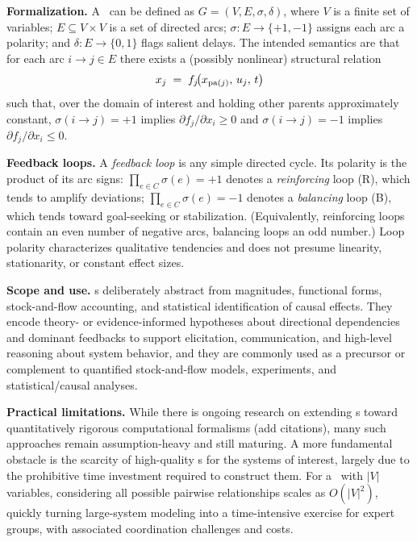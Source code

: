 \medskip
\noindent
\textbf{Formalization.} A \CLD\ can be defined as \(G=(V,E,\sigma,\delta)\), where \(V\) is a finite set of variables; \(E\subseteq V\times V\) is a set of directed arcs; \(\sigma:E\to\{+1,-1\}\) assigns each arc a polarity; and \(\delta:E\to\{0,1\}\) flags salient delays. The intended semantics are that for each arc \(i\!\to\!j\in E\) there exists a (possibly nonlinear) structural relation
\[
x_j \;=\; f_j\!\bigl(x_{\text{pa}(j)},\,u_j,\,t\bigr)
\]
such that, over the domain of interest and holding other parents approximately constant, \(\sigma(i\!\to\!j)=+1\) implies \(\partial f_j/\partial x_i \ge 0\) and \(\sigma(i\!\to\!j)=-1\) implies \(\partial f_j/\partial x_i \le 0\).

\medskip
\noindent
\textbf{Feedback loops.} A \emph{feedback loop} is any simple directed cycle. Its polarity is the product of its arc signs: \(\prod_{e\in C}\sigma(e)=+1\) denotes a \emph{reinforcing} loop (R), which tends to amplify deviations; \(\prod_{e\in C}\sigma(e)=-1\) denotes a \emph{balancing} loop (B), which tends toward goal-seeking or stabilization. (Equivalently, reinforcing loops contain an even number of negative arcs, balancing loops an odd number.) Loop polarity characterizes qualitative tendencies and does not presume linearity, stationarity, or constant effect sizes.

\medskip
\noindent
\textbf{Scope and use.} \CLD s deliberately abstract from magnitudes, functional forms, stock-and-flow accounting, and statistical identification of causal effects. They encode theory- or evidence-informed hypotheses about directional dependencies and dominant feedbacks to support elicitation, communication, and high-level reasoning about system behavior, and they are commonly used as a precursor or complement to quantified stock-and-flow models, experiments, and statistical/causal analyses.

\medskip
\noindent
\textbf{Practical limitations.} While there is ongoing research on extending \CLD s toward quantitatively rigorous computational formalisms (add citations), many such approaches remain assumption-heavy and still maturing. A more fundamental obstacle is the scarcity of high-quality \CLD s for the systems of interest, largely due to the prohibitive time investment required to construct them. For a \CLD\ with \(|V|\) variables, considering all possible pairwise relationships scales as \(O(|V|^2)\), quickly turning large-system modeling into a time-intensive exercise for expert groups, with associated coordination challenges and costs.


